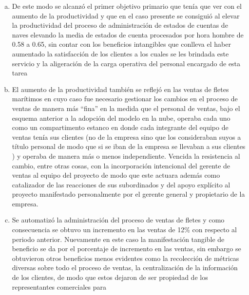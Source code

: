 \begin{enumerate}[a.]
          mismos interesados sin que mediara ``un equipo de expertos de TI'',
          con la posibilidad adem\'as de usar un periodo de prueba gratuito,
          usualmente de un mes, otorgado por los proveedores
    \item De este modo se alcanz\'o el primer objetivo primario que ten\'ia que
          ver con el aumento de la productividad y que en el caso presente se
          consigui\'o al elevar la productividad del proceso de administraci\'on
          de estados de cuentas de naves elevando la media de estados de cuenta
          procesados por hora hombre de 0.58 a 0.65, sin contar con los beneficios
          intangibles que conlleva el haber aumentado la satisfacci\'on de los
          clientes a los cuales se les brindada este servicio y la aligeraci\'on
          de la carga operativa del personal encargado de esta tarea
    \item El aumento de la productividad tambi\'en se reflej\'o en las ventas de
          fletes mar\'itimos en cuyo caso fue necesario gestionar los cambios en
          el proceso de ventas de manera m\'as ``fina'' en la medida que el personal
          de ventas, bajo el esquema anterior a la adopci\'on del modelo en la
          nube, operaba cada uno como un compartimento estanco en donde cada
          integrante del equipo de ventas ten\'ia sus clientes (no de la empresa
          sino que los consideraban suyos a t\'itulo personal de modo que si se
          iban de la empresa se llevaban a sus clientes ) y operaba de manera
          m\'as o menos independiente. Vencida la resistencia al cambio, entre
          otras cosas, con la incorporaci\'on intencional del gerente de ventas
          al equipo del proyecto de modo que este actuara adem\'as como catalizador
          de las reacciones de sus subordinados y del apoyo expl\'icito al
          proyecto manifestado personalmente por el gerente general y propietario
          de la empresa.
    \item Se automatiz\'o la administraci\'on del proceso de ventas de fletes y
          como consecuencia se obtuvo un incremento en las ventas de 12\% con
          respecto al periodo anterior. Nuevamente en este caso la manifestaci\'on
          tangible de beneficio se da por el porcentaje de incremento en las ventas,
          sin embargo se obtuvieron otros beneficios menos evidentes como la
          recolecci\'on de m\'etricas diversas sobre todo el proceso de ventas,
          la centralizaci\'on de la informaci\'on de los clientes, de modo que
          estos dejaron de ser propiedad de los representantes comerciales para

\end{enumerate}
